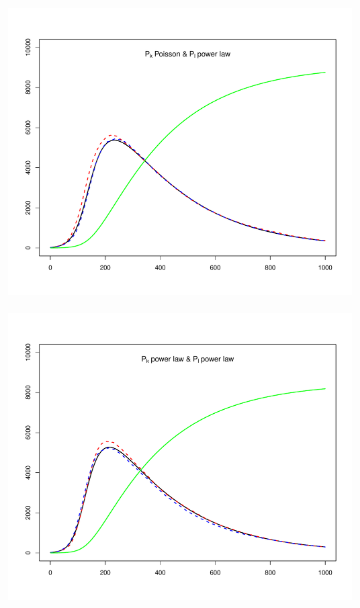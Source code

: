 \begin{figure}[hbtp]
\begin{subfigure}[b]{0.45\textwidth}
    \end{subfigure}
    \newline
    \begin{subfigure}[b]{0.45\textwidth}
        \centering
        \includegraphics[width=\textwidth, trim=30 20 30 20, clip]{../img/sir_01.pdf}
    \end{subfigure}
    \hspace{0.08\textwidth}
    \begin{subfigure}[b]{0.45\textwidth}
        \centering
        \includegraphics[width=\textwidth, trim=30 20 30 20, clip]{../img/sir_11.pdf}

\end{subfigure}
\end{figure}
